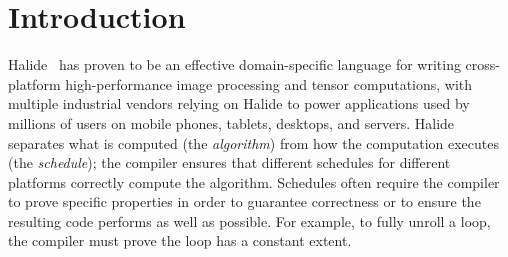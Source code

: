 \documentclass[acmsmall,review,anonymous]{acmart}\settopmatter{printfolios=true,printccs=false,printacmref=false}
\begin{document}




\maketitle


\section{Introduction}
%

Halide~\cite{ragankelley2012halide, ragankelley2013halide} has proven to be an
effective domain-specific language for writing cross-platform
high-performance image processing and tensor computations, with multiple industrial vendors relying on Halide to power
applications used by millions of users on mobile phones, tablets, desktops, and
servers.  Halide separates what is computed (the \textit{algorithm}) from how
the computation executes (the \textit{schedule}); the compiler ensures that
different schedules for different platforms correctly compute the algorithm.
Schedules often require the compiler to prove specific properties in order
to guarantee correctness or to ensure the resulting code performs as well
as possible.  For example, to fully unroll a loop, the compiler must prove
the loop has a constant extent.
\end{document}
